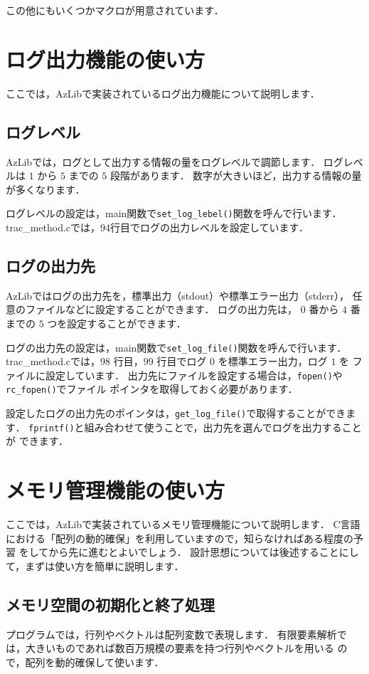 この他にもいくつかマクロが用意されています．


\section{ログ出力機能の使い方} \label{sec:log-output-utl}
ここでは，AzLibで実装されているログ出力機能について説明します．

\subsection{ログレベル}
AzLibでは，ログとして出力する情報の量をログレベルで調節します．
ログレベルは $1$ から $5$ までの $5$ 段階があります．
数字が大きいほど，出力する情報の量が多くなります．

ログレベルの設定は，main関数で\verb|set_log_lebel()|関数を呼んで行います．
trac\_method.cでは，94行目でログの出力レベルを設定しています．

\subsection{ログの出力先}
AzLibではログの出力先を，標準出力（stdout）や標準エラー出力（stderr），
任意のファイルなどに設定することができます．
ログの出力先は， $0$ 番から $4$ 番までの $5$ つを設定することができます．

ログの出力先の設定は，main関数で\verb|set_log_file()|関数を呼んで行います．
trac\_method.cでは，$98$ 行目，$99$ 行目でログ $0$ を標準エラー出力，ログ $1$ を
ファイルに設定しています．
出力先にファイルを設定する場合は，\verb|fopen()|や\verb|rc_fopen()|でファイル
ポインタを取得しておく必要があります．

設定したログの出力先のポインタは，\verb|get_log_file()|で取得することができます．
\verb|fprintf()|と組み合わせて使うことで，出力先を選んでログを出力することが
できます．


\section{メモリ管理機能の使い方}
ここでは，AzLibで実装されているメモリ管理機能について説明します．
C言語における「配列の動的確保」を利用していますので，知らなければある程度の予習
をしてから先に進むとよいでしょう．
設計思想については後述することにして，まずは使い方を簡単に説明します．

\subsection{メモリ空間の初期化と終了処理}
プログラムでは，行列やベクトルは配列変数で表現します．
有限要素解析では，大きいものであれば数百万規模の要素を持つ行列やベクトルを用いる
ので，配列を動的確保して使います．

